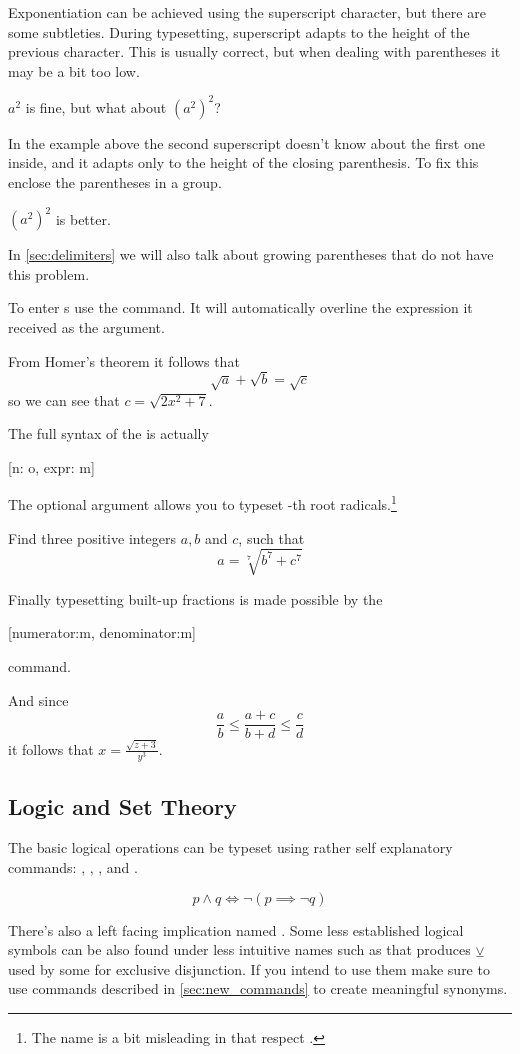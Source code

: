 Exponentiation can be achieved using the superscript \ai{\^{}}
character, but there are some subtleties. During typesetting, superscript
adapts to the height of the previous character. This is usually correct, but
when dealing with parentheses it may be a bit too low.
\begin{example}
\( a^2 \) is fine, but what
about \( (a^2)^2 \)?
\end{example}
In the example above the second superscript doesn't know about the first one
inside, and it adapts only to the height of the closing parenthesis. To fix
this enclose the parentheses in a group.
\begin{example}
\( {(a^2)}^2 \) is better.
\end{example}
In \autoref{sec:delimiters} we will also talk about growing parentheses that do
not have this problem.

To enter s use the  command. It will automatically
overline the expression it received as the argument.
\begin{example}
From Homer's theorem it 
follows that
\[
  \sqrt{a} + \sqrt{b} = \sqrt{c}
\]
so we can see that
\(c = \sqrt{2x^2+7}\).
\end{example}
The full syntax of the  is actually
\begin{lscommand}
  [n: o, expr: m]
\end{lscommand}
The optional argument  allows you to typeset -th root
radicals.\footnote{The name  is a bit misleading in that respect
  \smiley.}
\begin{example}
Find three positive integers
\(a, b\) and \(c\), such that
\[
  a = \sqrt[7]{b^7 + c^7}
\]
\end{example}

Finally typesetting built-up fractions is made possible by the
\begin{lscommand}
  [numerator:m, denominator:m]
\end{lscommand}
command.
\begin{example}
And since
\[
  \frac{a}{b} \leq
  \frac{a+c}{b+d} \leq
  \frac{c}{d}
\]
it follows that
\(x = \frac{\sqrt{z+3}}{y^3}\).
\end{example}

\subsection{Logic and Set Theory}

The basic logical operations can be typeset using rather self explanatory
commands: , , ,  and .
\begin{example}
\[
  p \land q \iff 
  \lnot (p \implies \lnot q) 
\]
\end{example}
There's also a left facing implication named . Some less
established logical symbols can be also found under less intuitive names such
as  that produces \(\veebar\) used by some for exclusive
disjunction. If you intend to use them make sure to use commands described in
\autoref{sec:new_commands} to create meaningful synonyms.

